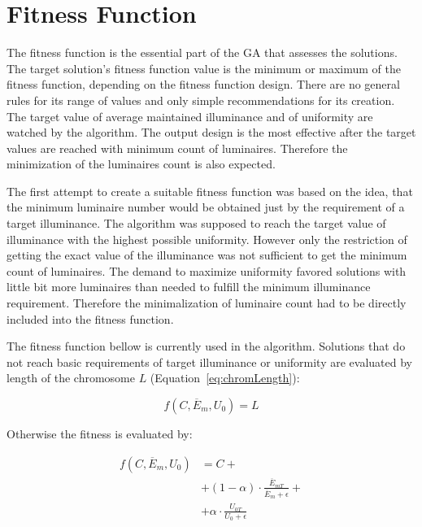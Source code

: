 \section{Fitness Function}
The fitness function is the essential part of the GA that assesses the solutions. The target solution's fitness function value is the minimum or maximum of the fitness function, depending on the fitness function design. There are no general rules for its range of values and only simple recommendations for its creation. The target value of average maintained illuminance and of uniformity are watched by the algorithm. The output design is the most effective after the target values are reached with minimum count of luminaires. Therefore the minimization of the luminaires count is also expected.

The first attempt to create a suitable fitness function was based on the idea, that the minimum luminaire number would be obtained just by the requirement of a target illuminance. The algorithm was supposed to reach the target value of illuminance with the highest possible uniformity. However only the restriction of getting the exact value of the illuminance was not sufficient to get the minimum count of luminaires. The demand to maximize uniformity favored solutions with little bit more luminaires than needed to fulfill the minimum illuminance requirement. Therefore the minimalization of luminaire count had to be directly included into the fitness function.

The fitness function bellow is currently used in the algorithm. Solutions that do not reach basic requirements of target illuminance or uniformity are evaluated by length of the chromosome $L$ (Equation~\ref{eq:chromLength}):

\begin{equation}
\label{eq:fitV2EUA}
	f\left(C,\overline{E}_{m}, U_0\right)= L
\end{equation}

\noindent Otherwise the fitness is evaluated by:

\begin{equation}
\label{eq:fitV2EUB}
\begin{split}
f\left(C, \overline{E}_{m}, U_0\right)&=C +\\
& + \left( 1 - \alpha\right)\cdot\frac{\overline{E}_{mT}}{\overline{E}_{m}+\epsilon} + \\
& + \alpha\cdot\frac{U_{0T}}{U_0 + \epsilon}
\end{split}
\end{equation}

